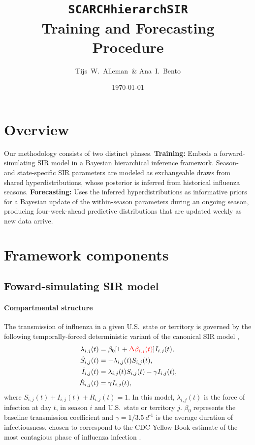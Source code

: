\documentclass[11pt]{article}
\title{\texttt{SCARCHhierarchSIR}\\Training and Forecasting Procedure}
\author{Tijs~W.~Alleman~\& Ana~I.~Bento}
\date{\today}
\begin{document}
\maketitle


\section{Overview}

Our methodology consists of two distinct phases. \textbf{Training:} Embeds a forward-simulating SIR model in a Bayesian hierarchical inference framework. Season- and state-specific SIR parameters are modeled as exchangeable draws from shared hyperdistributions, whose posterior is inferred from historical influenza seasons. \textbf{Forecasting:} Uses the inferred hyperdistributions as informative priors for a Bayesian update of the within-season parameters during an ongoing season, producing four-week-ahead predictive distributions that are updated weekly as new data arrive.

\section{Framework components}
\subsection{Foward-simulating SIR model}


\paragraph{Compartmental structure} The transmission of influenza in a given U.S.\ state or territory is governed by the following temporally-forced deterministic variant of the canonical SIR model \citep{keeling2008},
\begin{align}
    \lambda_{i,j}(t) &= \beta_0 [1 + \textcolor{red}{\Delta \beta_{i,j}(t)}]  I_{i,j}(t), \nonumber \\
    \dot{S}_{i,j}(t) &= - \lambda_{i,j}(t) S_{i,j}(t), \nonumber \\ 
    \dot{I}_{i,j}(t) &= \lambda_{i,j}(t) S_{i,j}(t) - \gamma I_{i,j}(t), \nonumber \\
    \dot{R}_{i,j}(t) &= \gamma I_{i,j}(t),
    \label{eq:ODE_simulation}
\end{align}
where $S_{i,j}(t) + I_{i,j}(t) + R_{i,j}(t) = 1$. In this model, $\lambda_{i,j}(t)$ is the force of infection at day $t$, in season $i$ and U.S.\ state or territory $j$. $\beta_0$ represents the baseline transmission coefficient and $\gamma=1/3.5~d^{\text{-}1}$ is the average duration of infectiousness, chosen to correspond to the CDC Yellow Book estimate of the most contagious phase of influenza infection \citep{CDCyellowbook}.\\
\end{document}
